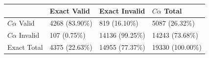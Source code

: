 \begin{tabular}{llll}
\toprule
 & Exact Valid & Exact Invalid & $C\alpha$ Total \\
\midrule
$C\alpha$ Valid & 4268 (83.90\%) & 819 (16.10\%) & 5087 (26.32\%) \\
$C\alpha$ Invalid & 107 (0.75\%) & 14136 (99.25\%) & 14243 (73.68\%) \\
Exact Total & 4375 (22.63\%) & 14955 (77.37\%) & 19330 (100.00\%) \\
\bottomrule
\end{tabular}
